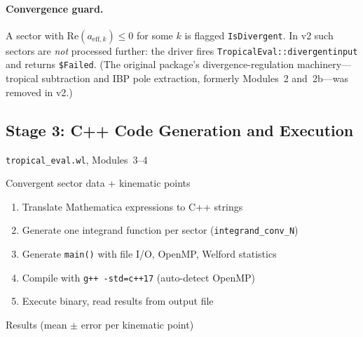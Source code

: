 \documentclass[11pt,a4paper]{article}
\begin{document}
\paragraph{Convergence guard.} A sector with $\mathrm{Re}(a_{\mathrm{eff},k}) \leq 0$ for some $k$ is flagged \texttt{IsDivergent}. In v2 such sectors are \emph{not} processed further: the driver fires \texttt{TropicalEval::divergentinput} and returns \texttt{\$Failed}. (The original package's divergence-regulation machinery---tropical subtraction and IBP pole extraction, formerly Modules~2 and~2b---was removed in v2.)

\subsection{Stage 3: C++ Code Generation and Execution}
\begin{description}[style=nextline]
  \item[Source:] \texttt{tropical\_eval.wl}, Modules~3--4
  \item[Input:] Convergent sector data + kinematic points
  \item[Process:]
    \begin{enumerate}[label=(\alph*)]
      \item Translate Mathematica expressions to C++ strings
      \item Generate one integrand function per sector (\texttt{integrand\_conv\_N})
      \item Generate \texttt{main()} with file I/O, OpenMP, Welford statistics
      \item Compile with \texttt{g++ -std=c++17} (auto-detect OpenMP)
      \item Execute binary, read results from output file
    \end{enumerate}
  \item[Output:] Results (mean $\pm$ error per kinematic point)
\end{description}
\end{document}
